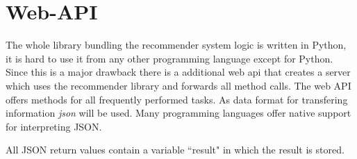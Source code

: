 

\section{Web-API}
\label{sec:web-api}
The whole library bundling the recommender system logic is written in Python, it is hard to use it from any other programming language except for Python.
Since this is a major drawback there is a additional \gls{web api} that creates a server which uses the recommender library and forwards all method calls.
The web API offers methods for all frequently performed tasks.
As data format for transfering information \textit{\gls{json}} will be used.
Many programming languages offer native support for interpreting JSON.

All JSON return values contain a variable ``result" in which the result is stored.


